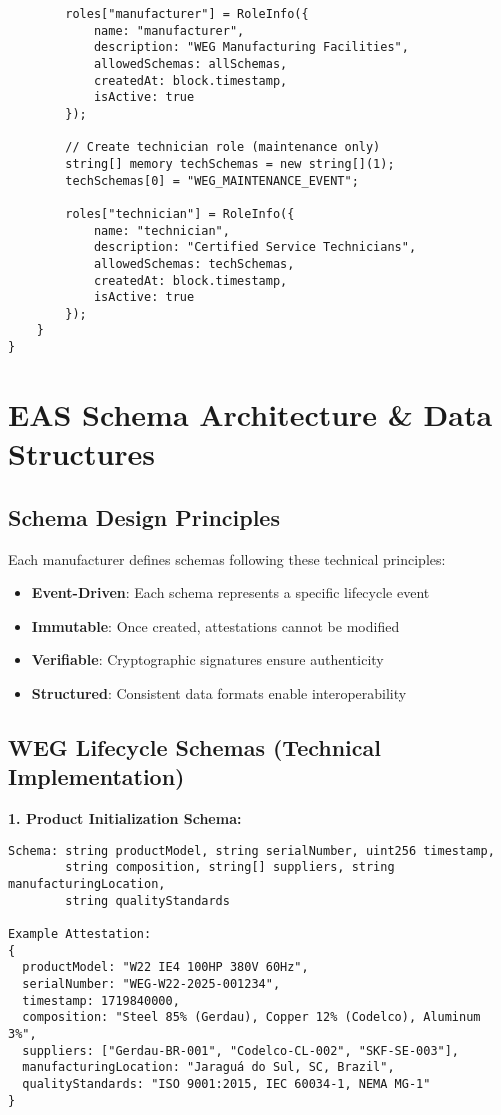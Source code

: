 \documentclass[11pt,a4paper]{article}
\begin{document}
\begin{verbatim}
        roles["manufacturer"] = RoleInfo({
            name: "manufacturer",
            description: "WEG Manufacturing Facilities",
            allowedSchemas: allSchemas,
            createdAt: block.timestamp,
            isActive: true
        });
        
        // Create technician role (maintenance only)
        string[] memory techSchemas = new string[](1);
        techSchemas[0] = "WEG_MAINTENANCE_EVENT";
        
        roles["technician"] = RoleInfo({
            name: "technician",
            description: "Certified Service Technicians",
            allowedSchemas: techSchemas,
            createdAt: block.timestamp,
            isActive: true
        });
    }
}
\end{verbatim}

\section{EAS Schema Architecture \& Data Structures}

\subsection{Schema Design Principles}

Each manufacturer defines schemas following these technical principles:

\begin{itemize}[leftmargin=0.5cm]
    \item \textbf{Event-Driven}: Each schema represents a specific lifecycle event
    \item \textbf{Immutable}: Once created, attestations cannot be modified
    \item \textbf{Verifiable}: Cryptographic signatures ensure authenticity
    \item \textbf{Structured}: Consistent data formats enable interoperability
\end{itemize}

\subsection{WEG Lifecycle Schemas (Technical Implementation)}

\textbf{1. Product Initialization Schema:}
\begin{verbatim}
Schema: string productModel, string serialNumber, uint256 timestamp,
        string composition, string[] suppliers, string manufacturingLocation,
        string qualityStandards

Example Attestation:
{
  productModel: "W22 IE4 100HP 380V 60Hz",
  serialNumber: "WEG-W22-2025-001234",
  timestamp: 1719840000,
  composition: "Steel 85% (Gerdau), Copper 12% (Codelco), Aluminum 3%",
  suppliers: ["Gerdau-BR-001", "Codelco-CL-002", "SKF-SE-003"],
  manufacturingLocation: "Jaraguá do Sul, SC, Brazil",
  qualityStandards: "ISO 9001:2015, IEC 60034-1, NEMA MG-1"
}
\end{verbatim}
\end{document}
